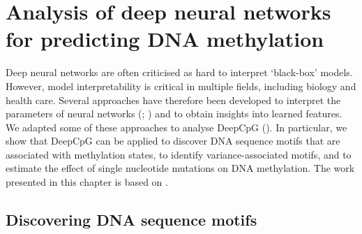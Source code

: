 \chapter{Analysis of deep neural networks for predicting DNA methylation} \label{sec:dcpg_ana}

\ifpdf
    \graphicspath{{Chapter5/Figs/Raster/}{Chapter5/Figs/PDF/}{Chapter5/Figs/}}
\else
    \graphicspath{{Chapter5/Figs/Vector/}{Chapter5/Figs/}}
\fi

Deep neural networks are often criticised as hard to interpret `black-box' models. However, model interpretability is critical in multiple fields, including biology and health care. Several approaches have therefore been developed to interpret the parameters of neural networks (; ) and to obtain insights into learned features. We adapted some of these approaches to analyse DeepCpG (). In particular, we show that DeepCpG can be applied to discover DNA sequence motifs that are associated with methylation states, to identify variance-associated motifs, and to estimate the effect of single nucleotide mutations on DNA methylation. The work presented in this chapter is based on \citet{angermueller_accurate_2017}.


\section{Discovering DNA sequence motifs} \label{sec:dcpg_ana_motifs}

